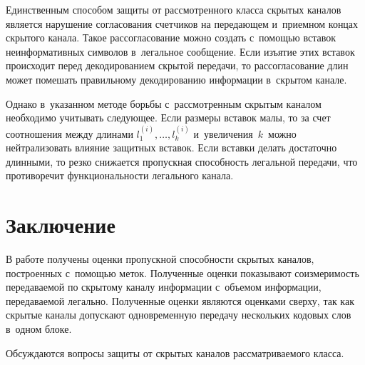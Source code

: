 \begin{multicols}{2}
  Единственным способом защиты от рас\-смот\-рен\-но\-го класса скрытых каналов 
является нарушение согласования счетчиков на передающем и~прием\-ном 
концах скрытого канала. Такое рассогласование можно создать с~помощью 
вставок неинформативных символов в~легальное сообщение. Если изъятие этих 
вставок происходит перед декодированием скрытой передачи, то 
рассогласование длин может помешать правильному декодированию 
информации в~скрытом канале. 
  
  Однако в~указанном методе борьбы с~рас\-смот\-рен\-ным скрытым каналом 
необходимо учитывать следующее. Если размеры вставок малы, то за счет 
соотношения между длинами $l_1^{(i)},\ldots , l_k^{(i)}$ 
и~увеличения~$k$~можно нейтрализовать влияние защитных вставок. Если 
вставки делать достаточно длинными, то резко снижается пропускная 
способность легальной передачи, что противоречит функциональности 
легального канала. 
  
\section{Заключение}

  В работе получены оценки пропускной способности скрытых каналов, 
построенных с~помощью меток. Полученные оценки показывают 
соизмеримость передаваемой по скрытому каналу информации с~объемом 
информации, передаваемой легально. Полученные оценки являются оценками 
сверху, так как  скрытые каналы допускают одновременную передачу 
нескольких кодовых слов в~одном блоке. 
  
  Обсуждаются вопросы защиты от скрытых каналов рассматриваемого класса. 
  

\end{multicols}

